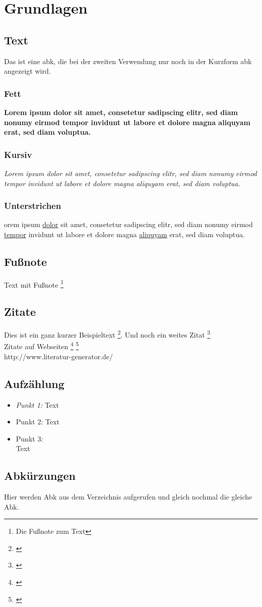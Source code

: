 \chapter{Grundlagen}
\section{Text}
Das ist eine \gls{abk}, die bei der zweiten Verwendung nur noch in der Kurzform \gls{abk} angezeigt wird.

\subsection{Fett}
\textbf{Lorem ipsum dolor sit amet, consetetur sadipscing elitr, sed diam nonumy eirmod tempor invidunt ut labore et dolore magna aliquyam erat, sed diam voluptua.}

\subsection{Kursiv}
\textit{Lorem ipsum dolor sit amet, consetetur sadipscing elitr, sed diam nonumy eirmod tempor invidunt ut labore et dolore magna aliquyam erat, sed diam voluptua.}

\subsection{Unterstrichen}
orem ipsum \underline{dolor} sit amet, consetetur sadipscing elitr, sed diam nonumy eirmod \underline{tempor} invidunt ut labore et dolore magna \underline{aliquyam} erat, sed diam voluptua.

\section{Fußnote}

Text mit Fußnote \footnote{Die Fußnote zum Text} 

\section{Zitate}

Dies ist ein ganz kurzer Beispieltext \footnote{\cite{Baeumle-Courth2004}}. Und noch ein weites Zitat \footnote{\cite{Torvalds2001}}
\\
Zitate auf Webseiten \footnote{\cite{gabler:individualsoftware}} \footnote{\cite{gabler:standardsoftware}}
\\
http://www.literatur-generator.de/

\section{Aufzählung}

\begin{itemize}
\item\textit{Punkt 1:} Text
\item Punkt 2: Text
\item Punkt 3: \\ Text
\end{itemize}

\section{Abkürzungen}
Hier werden \gls{Abk} aus dem Verzeichnis aufgerufen und gleich nochmal die gleiche \gls{Abk}.